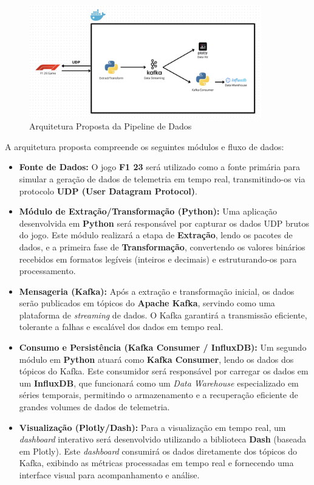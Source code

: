 \documentclass[12pt, %
openright, 
oneside, %
a4paper,    %
brazil]{facom-ufu-abntex2}
\begin{document}
\begin{figure}[h!]
    \centering
    \includegraphics[width=0.9\textwidth]{1744514910436.jpeg}
    \caption{Arquitetura Proposta da Pipeline de Dados}
    \label{fig:arquitetura}
\end{figure}

A arquitetura proposta compreende os seguintes módulos e fluxo de dados:
\begin{itemize}
    \item \textbf{Fonte de Dados:} O jogo \textbf{F1 23} será utilizado como a fonte primária para simular a geração de dados de telemetria em tempo real, transmitindo-os via protocolo \textbf{UDP (User Datagram Protocol)}.
    \item \textbf{Módulo de Extração/Transformação (Python):} Uma aplicação desenvolvida em \textbf{Python} será responsável por capturar os dados UDP brutos do jogo. Este módulo realizará a etapa de \textbf{Extração}, lendo os pacotes de dados, e a primeira fase de \textbf{Transformação}, convertendo os valores binários recebidos em formatos legíveis (inteiros e decimais) e estruturando-os para processamento.
    \item \textbf{Mensageria (Kafka):} Após a extração e transformação inicial, os dados serão publicados em tópicos do \textbf{Apache Kafka}, servindo como uma plataforma de \textit{streaming} de dados. O Kafka garantirá a transmissão eficiente, tolerante a falhas e escalável dos dados em tempo real.
    \item \textbf{Consumo e Persistência (Kafka Consumer / InfluxDB):} Um segundo módulo em \textbf{Python} atuará como \textbf{Kafka Consumer}, lendo os dados dos tópicos do Kafka. Este consumidor será responsável por carregar os dados em um \textbf{InfluxDB}, que funcionará como um \textit{Data Warehouse} especializado em séries temporais, permitindo o armazenamento e a recuperação eficiente de grandes volumes de dados de telemetria.
    \item \textbf{Visualização (Plotly/Dash):} Para a visualização em tempo real, um \textit{dashboard} interativo será desenvolvido utilizando a biblioteca \textbf{Dash} (baseada em Plotly). Este \textit{dashboard} consumirá os dados diretamente dos tópicos do Kafka, exibindo as métricas processadas em tempo real e fornecendo uma interface visual para acompanhamento e análise.
\end{itemize}
\end{document}
